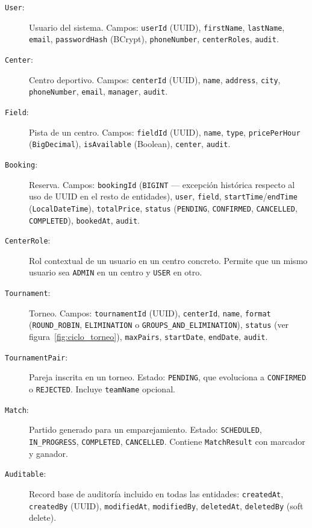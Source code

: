 \begin{description}
  \item[\texttt{User}:] Usuario del sistema. Campos: \texttt{userId} (UUID),
    \texttt{firstName}, \texttt{lastName}, \texttt{email}, \texttt{passwordHash}
    (BCrypt), \texttt{phoneNumber}, \texttt{centerRoles}, \texttt{audit}.

  \item[\texttt{Center}:] Centro deportivo. Campos: \texttt{centerId} (UUID),
    \texttt{name}, \texttt{address}, \texttt{city}, \texttt{phoneNumber},
    \texttt{email}, \texttt{manager}, \texttt{audit}.

  \item[\texttt{Field}:] Pista de un centro. Campos: \texttt{fieldId} (UUID),
    \texttt{name}, \texttt{type}, \texttt{pricePerHour} (\texttt{BigDecimal}),
    \texttt{isAvailable} (Boolean), \texttt{center}, \texttt{audit}.

  \item[\texttt{Booking}:] Reserva. Campos: \texttt{bookingId} (\texttt{BIGINT}
    — excepción histórica respecto al uso de UUID en el resto de entidades),
    \texttt{user}, \texttt{field}, \texttt{startTime}/\texttt{endTime}
    (\texttt{LocalDateTime}), \texttt{totalPrice}, \texttt{status}
    (\texttt{PENDING}, \texttt{CONFIRMED}, \texttt{CANCELLED}, \texttt{COMPLETED}),
    \texttt{bookedAt}, \texttt{audit}.

  \item[\texttt{CenterRole}:] Rol contextual de un usuario en un centro concreto.
    Permite que un mismo usuario sea \texttt{ADMIN} en un centro y \texttt{USER}
    en otro.

  \item[\texttt{Tournament}:] Torneo. Campos: \texttt{tournamentId} (UUID),
    \texttt{centerId}, \texttt{name}, \texttt{format}
    (\texttt{ROUND\_ROBIN}, \texttt{ELIMINATION} o
    \texttt{GROUPS\_AND\_ELIMINATION}),
    \texttt{status} (ver figura~\ref{fig:ciclo_torneo}), \texttt{maxPairs},
    \texttt{startDate}, \texttt{endDate}, \texttt{audit}.

  \item[\texttt{TournamentPair}:] Pareja inscrita en un torneo. Estado:
    \texttt{PENDING}, que evoluciona a \texttt{CONFIRMED} o \texttt{REJECTED}.
    Incluye \texttt{teamName} opcional.

  \item[\texttt{Match}:] Partido generado para un emparejamiento. Estado:
    \texttt{SCHEDULED}, \texttt{IN\_PROGRESS}, \texttt{COMPLETED},
    \texttt{CANCELLED}. Contiene \texttt{MatchResult} con marcador y ganador.

  \item[\texttt{Auditable}:] Record base de auditoría incluido en todas las
    entidades: \texttt{createdAt}, \texttt{createdBy} (UUID),
    \texttt{modifiedAt}, \texttt{modifiedBy}, \texttt{deletedAt},
    \texttt{deletedBy} (soft delete).
\end{description}

